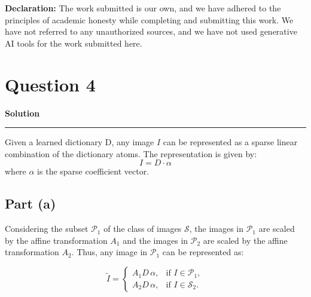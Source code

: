 \documentclass[a4paper,12pt]{article}
\title{\cooltitle{CS754 Assignment-5}}
\author{{\bf Saksham Rathi, Ekansh Ravi Shankar, Kshitij Vaidya}}
\date{}
\newenvironment{solution}[2][]{%
    \begin{mdframed}[linecolor=blue!70!black, linewidth=2pt, roundcorner=10pt, backgroundcolor=yellow!10!white, skipabove=12pt, skipbelow=12pt]%
        \textbf{\large #2}
        \par\noindent\rule{\textwidth}{0.4pt}
}{
    \end{mdframed}
}
\begin{document}
\maketitle
\textbf{Declaration:} The work submitted is our own, and
we have adhered to the principles of academic honesty while completing and submitting this work. We have not referred to any unauthorized sources, and we have not used generative AI tools for the work submitted here.

\section*{Question 4}

\begin{solution}{Solution}

\noindent Given a learned dictionary D, any image $I$ can be represented as a sparse linear combination of the dictionary atoms. The representation is given by:
\begin{equation}
    I = D \cdot \alpha
\end{equation}
where $\alpha$ is the sparse coefficient vector. 

\subsection*{Part (a)}

Considering the subset $\mathcal{P}_1$ of the class of images $\mathcal{S}$, the images in $\mathcal{P}_1$ are scaled by the affine transformation $A_1$ and the images in $\mathcal{P}_2$ are scaled by the affine transformation $A_2$. Thus, any image in $\mathcal{P}_1$ can be represented as:

\begin{equation}
  \tilde{I} = 
  \begin{cases}
  A_{1} D\,\alpha, & \text{if } I \in \mathcal{P}_1,\\
  A_{2} D\,\alpha, & \text{if } I \in \mathcal{S}_2.
  \end{cases}
\end{equation}


\end{solution}
\end{document}
